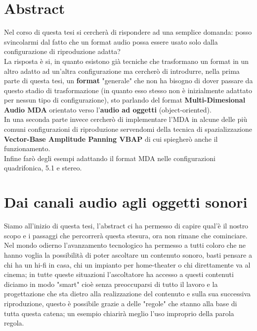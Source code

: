 \documentclass[12pt,a4paper]{report}
\begin{document}
\tableofcontents

\listoffigures



\chapter*{Abstract}

Nel corso di questa tesi si cercherà di rispondere ad una semplice domanda: posso svincolarmi dal fatto che un format audio possa essere usato solo dalla configurazione di riproduzione adatta?\\

La risposta è si, in quanto esistono già tecniche che trasformano un format in un altro adatto ad un'altra configurazione ma cercherò di introdurre, nella prima parte di questa tesi, un \textbf{format} "generale" che non ha bisogno di dover passare da questo stadio di trasformazione (in quanto esso stesso non è inizialmente adattato per nessun tipo di configurazione), sto parlando del format \textbf{Multi-Dimesional Audio MDA} orientato verso l'\textbf{audio ad oggetti} (object-oriented).\\

In una seconda parte invece cercherò di implementare l'MDA in alcune delle più comuni configurazioni di riproduzione servendomi della tecnica di spazializzazione \textbf{Vector-Base Amplitude Panning VBAP} di cui spiegherò anche il funzionamento.\\

Infine farò degli esempi adattando il format MDA nelle configurazioni quadrifonica, 5.1 e stereo.


\chapter{Dai canali audio agli oggetti sonori}

Siamo all'inizio di questa tesi, l'abstract ci ha permesso di capire qual'è il nostro scopo e i passaggi che percorrerà questa stesura, ora non rimane che cominciare.\\

Nel mondo odierno l'avanzamento tecnologico ha permesso a tutti coloro che ne hanno voglia la possibilità di poter ascoltare un contenuto sonoro, basti pensare a chi ha un hi-fi in casa, chi un impianto per home-theater o chi direttamente va al cinema; in tutte queste situazioni l'ascoltatore ha accesso a questi contenuti diciamo in modo "smart" cioè senza preoccuparsi di tutto il lavoro e la progettazione che sta dietro alla realizzazione del contenuto e sulla sua successiva riproduzione, questo è possibile grazie a delle "regole" che stanno alla base di tutta questa catena; un esempio chiarirà meglio l'uso improprio della parola regola.\\
\end{document}
